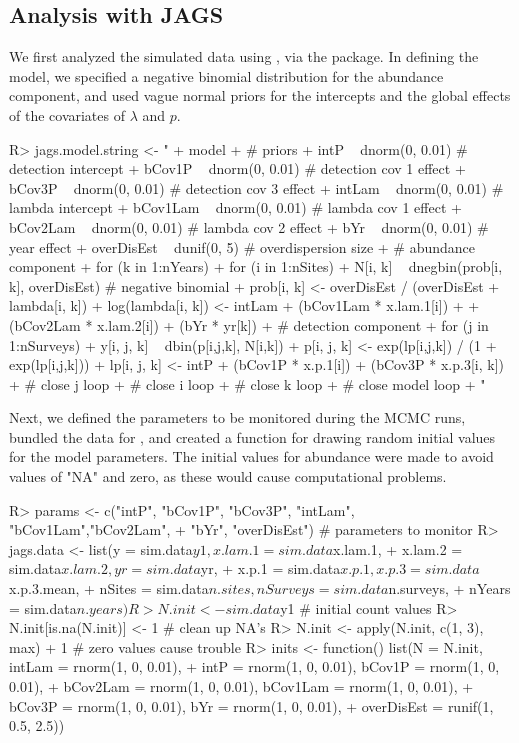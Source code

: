 \documentclass[article]{jss}
\begin{document}
\subsection[Analysis with JAGS]{Analysis with JAGS}
We first analyzed the simulated data using , via the  package. In defining the model, we specified a negative binomial distribution for the abundance component, and used vague normal priors for the intercepts and the global effects of the covariates of $\lambda$ and $p$.

\begin{Code}
R> jags.model.string <- "
+    model {
+    # priors
+    intP ~ dnorm(0, 0.01)       # detection intercept
+    bCov1P ~ dnorm(0, 0.01)     # detection cov 1 effect
+    bCov3P ~ dnorm(0, 0.01)     # detection cov 3 effect
+    intLam ~ dnorm(0, 0.01)     # lambda intercept
+    bCov1Lam ~ dnorm(0, 0.01)   # lambda cov 1 effect
+    bCov2Lam ~ dnorm(0, 0.01)   # lambda cov 2 effect
+    bYr ~ dnorm(0, 0.01)        # year effect
+    overDisEst ~ dunif(0, 5)    # overdispersion size
+    # abundance component
+    for (k in 1:nYears){
+      for (i in 1:nSites){
+        N[i, k] ~ dnegbin(prob[i, k], overDisEst) # negative binomial
+        prob[i, k] <- overDisEst / (overDisEst + lambda[i, k])
+        log(lambda[i, k]) <- intLam + (bCov1Lam * x.lam.1[i]) + 
+                             (bCov2Lam * x.lam.2[i]) + (bYr * yr[k])
+    # detection component
+        for (j in 1:nSurveys){
+          y[i, j, k] ~ dbin(p[i,j,k], N[i,k])
+          p[i, j, k] <- exp(lp[i,j,k]) / (1 + exp(lp[i,j,k]))
+          lp[i, j, k] <- intP + (bCov1P * x.p.1[i]) + (bCov3P * x.p.3[i, k])
+        } # close j loop
+      } # close i loop
+    } # close k loop
+  } # close model loop
+  "
\end{Code}

Next, we defined the parameters to be monitored during the MCMC runs, bundled the data for , and created a function for drawing random initial values for the model parameters. The initial values for abundance were made to avoid values of "NA" and zero, as these would cause computational problems.

\begin{Code}
R> params <- c("intP", "bCov1P", "bCov3P", "intLam", "bCov1Lam","bCov2Lam",
+              "bYr", "overDisEst") # parameters to monitor
R> jags.data <- list(y = sim.data$y1, x.lam.1 = sim.data$x.lam.1,
+               x.lam.2 = sim.data$x.lam.2, yr = sim.data$yr,
+               x.p.1 = sim.data$x.p.1, x.p.3 = sim.data$x.p.3.mean,
+               nSites = sim.data$n.sites, nSurveys = sim.data$n.surveys,
+               nYears = sim.data$n.years)
R> N.init <- sim.data$y1 # initial count values
R> N.init[is.na(N.init)] <- 1 # clean up NA's
R> N.init <- apply(N.init, c(1, 3), max) + 1 # zero values cause trouble
R> inits <- function() list(N = N.init, intLam = rnorm(1, 0, 0.01),
+               intP = rnorm(1, 0, 0.01), bCov1P = rnorm(1, 0, 0.01),
+               bCov2Lam = rnorm(1, 0, 0.01), bCov1Lam = rnorm(1, 0, 0.01),
+               bCov3P = rnorm(1, 0, 0.01), bYr = rnorm(1, 0, 0.01),
+               overDisEst = runif(1, 0.5, 2.5))
\end{Code}
\end{document}
